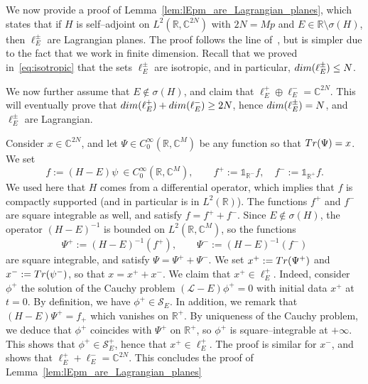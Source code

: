 \documentclass[11pt]{amsart}
\numberwithin{equation}{section} %
\newcommand\1{{\mathds 1}}
\def\C{{\mathbb C}}
\def\R{{\mathbb R}}
\def\cL{{\mathcal L}}
\def\cS{{\mathcal S}}
\def\Tr{{\rm Tr}}
\def\dim{{\rm dim }}
\begin{document}
We now provide a proof of Lemma~\ref{lem:lEpm_are_Lagrangian_planes}, which states that if $H$ is self--adjoint on $L^2(\R, \C^{2N})$ with $2N = Mp$ and $E \in \R \setminus \sigma(H)$, then $\ell_E^\pm$ are Lagrangian planes. The proof follows the line of~\cite[Theorem 27]{Gon-23}, but is simpler due to the fact that we work in finite dimension. Recall that we proved in~\eqref{eq:isotropic} that the sets $\ell_E^\pm$ are isotropic, and in particular, $\dim(\ell_E^\pm) \le N$.

\medskip

We now further assume that $E \notin \sigma(H)$, and claim that $\ell_E^+ \oplus \ell_E^- = \C^{2N}$. This will eventually prove that $\dim(\ell_E^+) + \dim(\ell_E^-) \ge 2N$, hence $\dim(\ell_E^\pm) = N$, and $\ell_E^\pm$ are Lagrangian.

Consider $x \in \C^{2N}$, and let $\Psi \in C^\infty_0(\R, \C^M)$ be any function so that $\Tr(\Psi) = x$. We set 
\[
    f := (H - E) \psi \ \in C^\infty_0(\R, \C^M), \qquad f^+ := \1_{\R^-} f, \quad f^- := \1_{\R^+} f.
\]
We used here that $H$ comes from a differential operator, which implies that $f$ is compactly supported (and in particular is in $L^2(\R)$). The functions $f^+$ and $f^-$ are square integrable as well, and satisfy $f = f^+ + f^-$. Since $E \notin \sigma(H)$, the operator $(H-E)^{-1}$ is bounded on $L^2(\R, \C^M)$, so the functions
\[
\Psi^+ := (H - E)^{-1}(f^+), \qquad \Psi^- := (H - E)^{-1} (f^-)
\]
are square integrable, and satisfy $\Psi = \Psi^+ + \Psi^-$. We set $x^+ := \Tr(\Psi^+)$ and $x^- := \Tr(\psi^-)$, so that $x = x^+ + x^-$. We claim that $x^+ \in \ell_E^+$. Indeed, consider $\phi^+$ the solution of the Cauchy problem $(\cL - E) \phi^+ = 0$ with initial data $x^+$ at $t = 0$. By definition, we have $\phi^+ \in \cS_E$. In addition, we remark that $(H - E) \Psi^+ = f_+$ which vanishes on $\R^+$. By uniqueness of the Cauchy problem, we deduce that $\phi^+$ coincides with $\Psi^+$ on $\R^+$, so $\phi^+$ is square--integrable at $+\infty$. This shows that $\phi^+ \in \cS_E^+$, hence that $x^+ \in \ell_E^+$. The proof is similar for $x^-$, and shows that $\ell_E^+ + \ell_E^- = \C^{2N}$. This concludes the proof of Lemma~\ref{lem:lEpm_are_Lagrangian_planes}
\end{document}
